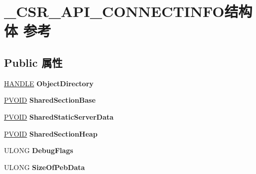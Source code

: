 \hypertarget{struct___c_s_r___a_p_i___c_o_n_n_e_c_t_i_n_f_o}{}\section{\+\_\+\+C\+S\+R\+\_\+\+A\+P\+I\+\_\+\+C\+O\+N\+N\+E\+C\+T\+I\+N\+F\+O结构体 参考}
\label{struct___c_s_r___a_p_i___c_o_n_n_e_c_t_i_n_f_o}
\subsection*{Public 属性}
\begin{DoxyCompactItemize}
\item 
\mbox{\label{struct___c_s_r___a_p_i___c_o_n_n_e_c_t_i_n_f_o_a0ce42514a8f821c18c2bdc4440d0f020}} 
\hyperlink{interfacevoid}{H\+A\+N\+D\+LE} {\bfseries Object\+Directory}
\item 
\mbox{\label{struct___c_s_r___a_p_i___c_o_n_n_e_c_t_i_n_f_o_a45b9612b37193c5a37f8931eb29d1056}} 
\hyperlink{interfacevoid}{P\+V\+O\+ID} {\bfseries Shared\+Section\+Base}
\item 
\mbox{\label{struct___c_s_r___a_p_i___c_o_n_n_e_c_t_i_n_f_o_a3d34b861d438dff758d512886b256ffb}} 
\hyperlink{interfacevoid}{P\+V\+O\+ID} {\bfseries Shared\+Static\+Server\+Data}
\item 
\mbox{\label{struct___c_s_r___a_p_i___c_o_n_n_e_c_t_i_n_f_o_a5a884572462602efa43568a8dc0612d1}} 
\hyperlink{interfacevoid}{P\+V\+O\+ID} {\bfseries Shared\+Section\+Heap}
\item 
\mbox{\label{struct___c_s_r___a_p_i___c_o_n_n_e_c_t_i_n_f_o_acf7aa936cfaffac522cbd23323476fed}} 
U\+L\+O\+NG {\bfseries Debug\+Flags}
\item 
\mbox{\label{struct___c_s_r___a_p_i___c_o_n_n_e_c_t_i_n_f_o_acdfdcfcc384e224850a83b3b5cbce8a7}} 
U\+L\+O\+NG {\bfseries Size\+Of\+Peb\+Data}
\item 

\end{DoxyCompactItemize}
